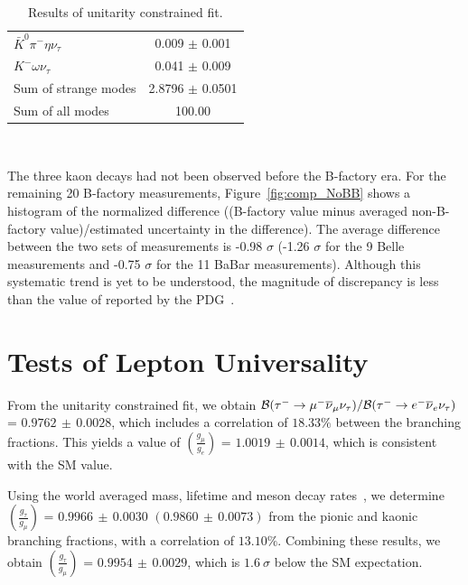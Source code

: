 \documentclass[fleqn,twoside]{article}
\begin{document}
\begin{table}[!hbtp]
\begin{tabular}{l| c}
$\bar{K}^0 \pi^- \eta \nu_\tau$                                     & 0.009 $\pm$ 0.001 \\ 
$K^- \omega \nu_\tau$                                              & 0.041 $\pm$ 0.009 \\ 
\hline
Sum of strange modes                                              & 2.8796 $\pm$ 0.0501 \\ \hline
Sum of all modes                                                  & 100.00              \\ \hline
\end{tabular}\\[2pt]
\caption{Results of unitarity constrained fit.}
\label{tab:TauGlobalFit}
\end{table}

The three kaon decays had not been observed before the B-factory era.
For the remaining 20 B-factory measurements, 
Figure~\ref{fig:comp_NoBB} shows a histogram of the normalized difference 
((B-factory value minus averaged non-B-factory value)/estimated uncertainty in the difference).
The average difference between the two sets of measurements is -0.98 $\sigma$ 
(-1.26 $\sigma$ for the 9 Belle measurements and -0.75 $\sigma$ for the 11 BaBar measurements).
Although this systematic trend is yet to be understood,
the magnitude of discrepancy is less than the value of reported by the PDG~\cite{PDG_2010}.



\section{Tests of Lepton Universality}
\label{sec:Tau_LU}

From the unitarity constrained fit, we obtain
$
{{\cal{B}}({\tau^- \to \mu^- \overline{\nu}_\mu \nu_\tau})}/
{{\cal{B}}({\tau^- \to e^- \overline{\nu}_e  \nu_\tau})}$
= 
$0.9762\, \pm\,   0.0028$,
which includes a correlation of $18.33\%$
between the branching fractions.
This yields a value of $\left( \frac{g_\mu}{g_e} \right)$ = 
$1.0019\, \pm\, 0.0014$,
which is consistent with the SM value.

Using the world averaged mass, lifetime and meson decay rates~\cite{PDG_2010}, we determine 
$\left( \frac{g_{\tau}}{g_{\mu}} \right)$ =
$0.9966\, \pm\, 0.0030$ $(0.9860\, \pm\, 0.0073)$
from the pionic and kaonic branching fractions,
with a correlation of $13.10\%$.
Combining these results, we obtain 
$\left( \frac{g_{\tau}}{g_{\mu}} \right)$ = $0.9954\, \pm\, 0.0029$,
which is $1.6~\sigma$ below the SM expectation.
\end{document}
